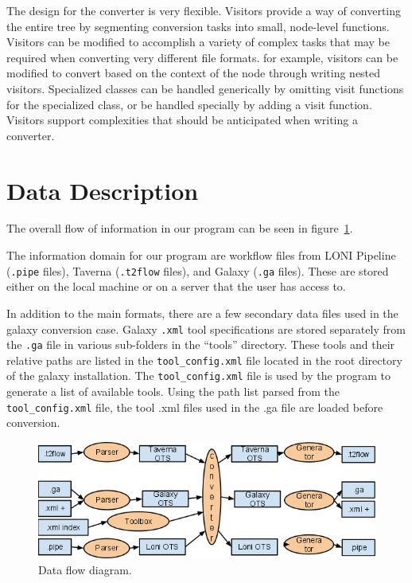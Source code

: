 \documentclass[12pt]{article}
\begin{document}
The design for the converter is very flexible. Visitors provide a way of converting the entire tree by segmenting conversion tasks into small, node-level functions.  Visitors can be modified to accomplish a variety of complex tasks that may be required when converting very different file formats. for example, visitors can be modified to convert based on the context of the node through writing nested visitors. Specialized classes can be handled generically by omitting visit functions for the specialized class, or be handled specially by adding a visit function.  Visitors support complexities that should be anticipated when writing a converter.

\section{Data Description}



The overall flow of information in our program can be seen in figure~\ref{fig:dataflow}.

The information domain for our program are workflow files from LONI Pipeline (\texttt{.pipe} files), Taverna (\texttt{.t2flow} files), and Galaxy (\texttt{.ga} files). These are stored either on the local machine or on a server that the user has access to.  

In addition to the main formats, there are a few secondary data files used in the galaxy conversion case. Galaxy \texttt{.xml} tool specifications are stored separately from the \texttt{.ga} file in various sub-folders in the ``tools'' directory. These tools and their relative paths are listed in the \texttt{tool\_config.xml} file located in the root directory of the galaxy installation. The \texttt{tool\_config.xml} file is used by the program to generate a list of available tools. Using the path list parsed from the \texttt{tool\_config.xml} file, the tool .xml files used in the .ga file are loaded before conversion.

\begin{figure}
\centering
\includegraphics[width=\textwidth]{dataflow.png}
\caption{Data flow diagram.}
\label{fig:dataflow}
\end{figure}
\end{document}
